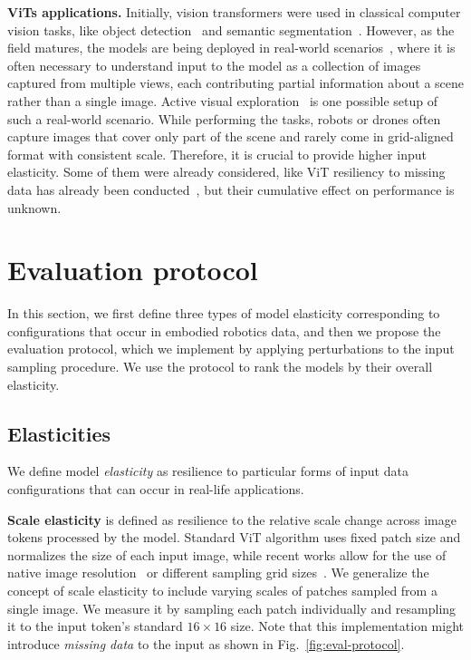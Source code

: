 \documentclass[10pt,twocolumn,letterpaper]{article}
\begin{document}
\textbf{ViTs applications.}
Initially, vision transformers were used in classical computer vision tasks, like object detection~\cite{carion2020endtoend} and semantic segmentation~\cite{kirillov2023segany}. However, as the field matures, the models are being deployed in real-world scenarios~\cite{li2021mvt}, where it is often necessary to understand input to the model as a collection of images captured from multiple views, each contributing partial information about a scene rather than a single image. Active visual exploration~\cite{Jha2023WACV,pardyl2023active} is one possible setup of such a real-world scenario. While performing the tasks, robots or drones often capture images that cover only part of the scene and rarely come in grid-aligned format with consistent scale. Therefore, it is crucial to provide higher input elasticity. Some of them were already considered, like ViT resiliency to missing data \cite{he2022masked} has already been conducted~\cite{tang2022patch,patchdropout23,yin2022avit}, but their cumulative effect on performance is unknown. 


\section{Evaluation protocol} \label{sec:evalprotocol}

In this section, we first define three types of model elasticity corresponding to configurations that occur in embodied robotics data, and then we propose the evaluation protocol, which we implement by applying perturbations to the input sampling procedure. We use the protocol to rank the models by their overall elasticity.

\subsection{Elasticities} \label{eval_definitions}

We define model \textit{elasticity} as resilience to particular forms of input data configurations that can occur in real-life applications.

\textbf{Scale elasticity} is defined as resilience to the relative scale change across image tokens processed by the model.
Standard ViT algorithm uses fixed patch size and normalizes the size of each input image, while recent works allow for the use of native image resolution~\cite{dehghani2024patch} or different sampling grid sizes~\cite{beyer2023flexivit}.
We generalize the concept of scale elasticity to include varying scales of patches sampled from a single image. We measure it by sampling each patch individually and resampling it to the input token's standard $16 \times 16$ size. Note that this implementation might introduce \textit{missing data} to the input as shown in Fig.~\ref{fig:eval-protocol}.
\end{document}
